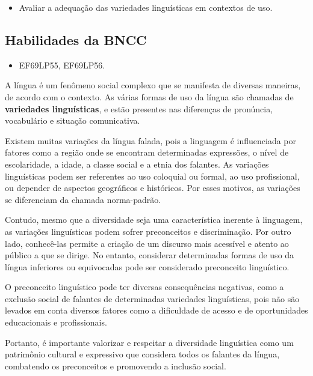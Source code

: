 {\begin{itemize}
  \item Avaliar a adequação das variedades linguísticas em contextos de uso.

\end{itemize}

\subsection{Habilidades da BNCC}

\begin{itemize}

  \item EF69LP55, EF69LP56.

\end{itemize}


A língua é um fenômeno social complexo que se manifesta de diversas
maneiras, de acordo com o contexto. As várias
formas de uso da língua são chamadas de \textbf{variedades linguísticas}, e estão
presentes nas diferenças de pronúncia, vocabulário e situação
comunicativa.

Existem muitas variações da língua falada, pois a linguagem é
influenciada por fatores como a região onde se encontram determinadas
expressões, o nível de escolaridade, a idade, a classe social e a etnia
dos falantes. As variações linguísticas podem ser referentes
ao uso coloquial ou formal, ao uso profissional, ou depender de aspectos
geográficos e históricos. Por esses motivos, as variações
se diferenciam da chamada norma-padrão.

Contudo, mesmo que a diversidade seja uma característica
inerente à linguagem, as variações linguísticas podem sofrer preconceitos
e discriminação. Por outro lado, conhecê-las permite a criação de um
discurso mais acessível e atento ao público a que se dirige. No entanto,
considerar determinadas formas de uso da língua inferiores ou
equivocadas pode ser considerado preconceito linguístico.

O preconceito linguístico pode ter diversas consequências negativas,
como a exclusão social de falantes de determinadas variedades
linguísticas, pois não são levados em conta diversos fatores como a
dificuldade de acesso e de oportunidades educacionais e profissionais.

Portanto, é importante valorizar e respeitar a diversidade linguística
como um patrimônio cultural e expressivo que considera todos os falantes
da língua, combatendo os preconceitos e promovendo a inclusão social.

}
